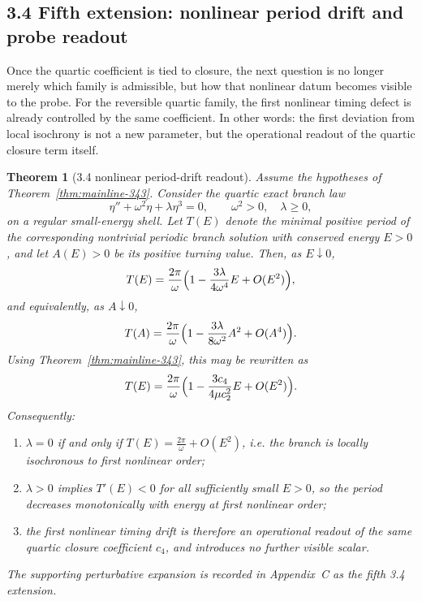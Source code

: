 \documentclass[12pt,a4paper]{article}
\newtheorem{theorem}{Theorem}[section]
\begin{document}
\subsection*{3.4 Fifth extension: nonlinear period drift and probe readout}
Once the quartic coefficient is tied to closure, the next question is no longer merely which family is admissible, but how that nonlinear datum becomes visible to the probe. For the reversible quartic family, the first nonlinear timing defect is already controlled by the same coefficient. In other words: the first deviation from local isochrony is not a new parameter, but the operational readout of the quartic closure term itself.

\begin{theorem}[3.4 nonlinear period-drift readout]
\label{thm:mainline-344}
Assume the hypotheses of Theorem~\ref{thm:mainline-343}. Consider the quartic exact branch law
\[
 \eta''+\omega^2\eta+\lambda\eta^3=0,
 \qquad \omega^2>0,\quad \lambda\ge 0,
\]
on a regular small-energy shell. Let $T(E)$ denote the minimal positive period of the corresponding nontrivial periodic branch solution with conserved energy $E>0$, and let $A(E)>0$ be its positive turning value. Then, as $E\downarrow 0$,
\[
 T(E)=\frac{2\pi}{\omega}\Bigl(1-\frac{3\lambda}{4\omega^4}E+O(E^2)\Bigr),
\]
and equivalently, as $A\downarrow 0$,
\[
 T(A)=\frac{2\pi}{\omega}\Bigl(1-\frac{3\lambda}{8\omega^2}A^2+O(A^4)\Bigr).
\]
Using Theorem~\ref{thm:mainline-343}, this may be rewritten as
\[
 T(E)=\frac{2\pi}{\omega}\Bigl(1-\frac{3c_4}{4\mu c_2^2}E+O(E^2)\Bigr).
\]
Consequently:
\begin{enumerate}[label=(\roman*)]
 \item $\lambda=0$ if and only if $T(E)=\tfrac{2\pi}{\omega}+O(E^2)$, i.e. the branch is locally isochronous to first nonlinear order;
 \item $\lambda>0$ implies $T'(E)<0$ for all sufficiently small $E>0$, so the period decreases monotonically with energy at first nonlinear order;
 \item the first nonlinear timing drift is therefore an operational readout of the same quartic closure coefficient $c_4$, and introduces no further visible scalar.
\end{enumerate}
The supporting perturbative expansion is recorded in Appendix~C as the fifth 3.4 extension.
\end{theorem}
\end{document}
